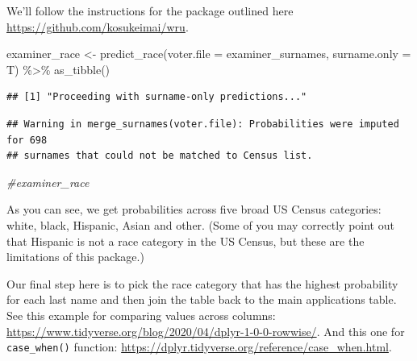 \documentclass[
]{article}
\newenvironment{Shaded}{\begin{snugshade}}{\end{snugshade}}
\newcommand{\AttributeTok}[1]{\textcolor[rgb]{0.77,0.63,0.00}{#1}}
\newcommand{\CommentTok}[1]{\textcolor[rgb]{0.56,0.35,0.01}{\textit{#1}}}
\newcommand{\FunctionTok}[1]{\textcolor[rgb]{0.00,0.00,0.00}{#1}}
\newcommand{\NormalTok}[1]{#1}
\newcommand{\OtherTok}[1]{\textcolor[rgb]{0.56,0.35,0.01}{#1}}
\newcommand{\SpecialCharTok}[1]{\textcolor[rgb]{0.00,0.00,0.00}{#1}}
\begin{document}
We'll follow the instructions for the package outlined here
\url{https://github.com/kosukeimai/wru}.

\begin{Shaded}
\begin{Highlighting}[]
\NormalTok{examiner\_race }\OtherTok{\textless{}{-}} \FunctionTok{predict\_race}\NormalTok{(}\AttributeTok{voter.file =}\NormalTok{ examiner\_surnames, }\AttributeTok{surname.only =}\NormalTok{ T) }\SpecialCharTok{\%\textgreater{}\%} 
  \FunctionTok{as\_tibble}\NormalTok{()}
\end{Highlighting}
\end{Shaded}

\begin{verbatim}
## [1] "Proceeding with surname-only predictions..."
\end{verbatim}

\begin{verbatim}
## Warning in merge_surnames(voter.file): Probabilities were imputed for 698
## surnames that could not be matched to Census list.
\end{verbatim}

\begin{Shaded}
\begin{Highlighting}[]
\CommentTok{\#examiner\_race}
\end{Highlighting}
\end{Shaded}

As you can see, we get probabilities across five broad US Census
categories: white, black, Hispanic, Asian and other. (Some of you may
correctly point out that Hispanic is not a race category in the US
Census, but these are the limitations of this package.)

Our final step here is to pick the race category that has the highest
probability for each last name and then join the table back to the main
applications table. See this example for comparing values across
columns:
\url{https://www.tidyverse.org/blog/2020/04/dplyr-1-0-0-rowwise/}. And
this one for \texttt{case\_when()} function:
\url{https://dplyr.tidyverse.org/reference/case_when.html}.
\end{document}
